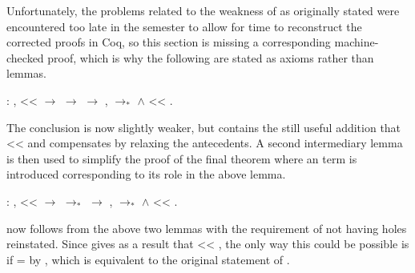 \documentclass[12pt]{report}
\begin{document}
Unfortunately, the problems related to the weakness of
 as originally stated were
encountered too late in the semester to allow for time to reconstruct
the corrected proofs in Coq, so this section is missing
a corresponding machine-checked proof, which is why the following are
stated as axioms rather than lemmas.



\begin{coqdoccode}
\coqdocemptyline
\coqdocemptyline
\coqdocindent{1.00em}
  : \coqdockw{\ensuremath{\forall}}   ,\coqdoceol
\coqdocindent{2.00em}
 <<  \ensuremath{\rightarrow}\coqdoceol
\coqdocindent{2.00em}
 $\to$  \ensuremath{\rightarrow}\coqdoceol
\coqdocindent{2.00em}
\coqdoctac{\ensuremath{\exists}} ,  $\to_*$  \ensuremath{\land}  << .\coqdoceol
\coqdocemptyline
\end{coqdoccode}

The conclusion is now slightly weaker, but contains the still useful
addition that  <<  and compensates by
relaxing the antecedents. A second intermediary lemma is then used to
simplify the proof of the final  theorem
where an  term is introduced corresponding to its role
in the above lemma.

\begin{coqdoccode}
\coqdocemptyline
\coqdocindent{1.00em}
  : \coqdockw{\ensuremath{\forall}}   ,\coqdoceol
\coqdocindent{2.00em}
 <<  \ensuremath{\rightarrow}\coqdoceol
\coqdocindent{2.00em}
 $\to_*$  \ensuremath{\rightarrow}\coqdoceol
\coqdocindent{2.00em}
\coqdoctac{\ensuremath{\exists}} ,  $\to_*$  \ensuremath{\land}  << .\coqdoceol
\coqdocemptyline
\end{coqdoccode}

 now follows from the above two lemmas with
the requirement of  not having holes reinstated. Since
 gives as a result that  <<
, the only way this could be possible is if
 =  by
, which is equivalent to the
original statement of . 
\end{document}
